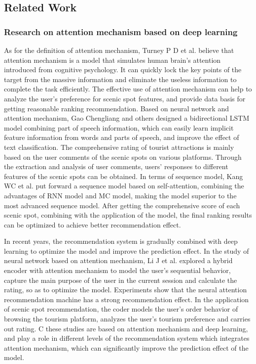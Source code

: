 \documentclass[conference]{IEEEtran}
\begin{document}
\subsection{Related Work}

\subsubsection{Research on attention mechanism based on deep learning}
As for the definition of attention mechanism, Turney P D et al. believe that attention mechanism is a model that simulates human brain's attention introduced from cognitive psychology. It can quickly lock the key points of the target from the massive information and eliminate the useless information to complete the task efficiently\cite{7}. The effective use of attention mechanism can help to analyze the user's preference for scenic spot features, and provide data basis for getting reasonable ranking recommendation. Based on neural network and attention mechanism, Gao Chengliang and others designed a bidirectional LSTM model combining part of speech information, which can easily learn implicit feature information from words and parts of speech, and improve the effect of text classification\cite{8}. The comprehensive rating of tourist attractions is mainly based on the user comments of the scenic spots on various platforms. Through the extraction and analysis of user comments, users' responses to different features of the scenic spots can be obtained. In terms of sequence model, Kang WC et al. put forward a sequence model based on self-attention, combining the advantages of RNN model and MC model, making the model superior to the most advanced sequence model\cite{9}. After getting the comprehensive score of each scenic spot, combining with the application of the model, the final ranking results can be optimized to achieve better recommendation effect.

In recent years, the recommendation system is gradually combined with deep learning to optimize the model and improve the prediction effect. In the study of neural network based on attention mechanism, Li J et al. explored a hybrid encoder with attention mechanism to model the user's sequential behavior, capture the main purpose of the user in the current session and calculate the rating, so as to optimize the model. Experiments show that the neural attention recommendation machine has a strong recommendation effect\cite{10}. In the application of scenic spot recommendation, the coder models the user's order behavior of browsing the tourism platform, analyzes the user's tourism preference and carries out rating. C these studies are based on attention mechanism and deep learning, and play a role in different levels of the recommendation system which integrates attention mechanism, which can significantly improve the prediction effect of the model.
\end{document}
